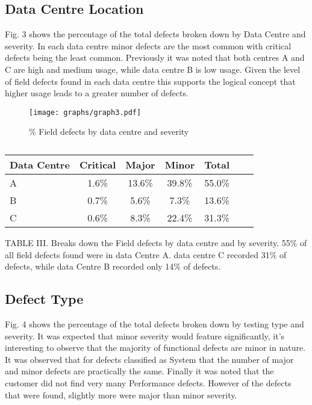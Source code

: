 \documentclass[conference]{IEEEtran}
\begin{document}
\subsection{Data Centre Location}

Fig. 3 shows the percentage of the total defects broken down by Data Centre and severity. In each data centre minor defects are the most common with critical defects being the least common. Previously it was noted that both centres A and C are high and medium usage, while data centre B is low usage. Given the level of field defects found in each data centre this supports the logical concept that higher usage leads to a greater number of defects.

\begin{figure}
\begin{center}
\texttt{[image: graphs/graph3.pdf]} 
\caption{\% Field defects by data centre and severity}
\end{center}
\label{fig:defectdatacentre}
\end{figure}

\begin {table}
\caption {}
\begin{center}
\begin{tabular}{l*{5}{c}r} Data Centre & Critical & Major & Minor &  Total \\ \hline A & 1.6\%	 & 13.6\%	& 39.8\%	& 55.0\% \\ B & 0.7\% & 5.6\% & 7.3\% & 13.6\% \\ C	& 0.6\% & 8.3\% & 22.4\%	 & 31.3\%   \end{tabular}
\end{center}
\end{table}


TABLE III. Breaks down the Field defects by data centre and by severity.  55\% of all field defects found were in data Centre A. data centre C recorded 31\% of defects, while data Centre B recorded only 14\% of defects. 

\subsection{Defect Type}

Fig. 4 shows the percentage of the total defects broken down by testing type and severity. It was expected that minor severity would feature significantly, it's interesting to observe that the majority of functional defects are minor in nature. It was observed that for defects classified as System that the number of major and minor defects are practically the same. Finally it was noted that the customer did not find very many Performance defects. However of the defects that were found, slightly more were major than minor severity.
\end{document}
